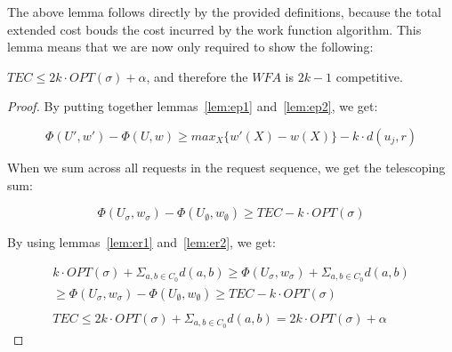 The above lemma follows directly by the provided definitions, because the total extended cost bouds the cost incurred by the work function algorithm. This lemma means that we are now only required to show the following:

\begin{lemma}
    $TEC \leq 2k \cdot  OPT(\sigma) + \alpha$, and therefore the $WFA$ is $2k-1$ competitive.
\end{lemma}

\begin{proof}
    By putting together lemmas~\ref{lem:ep1} and~\ref{lem:ep2}, we get:

    \begin{equation*}
        \Phi(U', w') - \Phi(U, w) \geq max_X\{ w'(X) - w(X)\} -k \cdot  d(u_j, r)
    \end{equation*}

    When we sum across all requests in the request sequence, we get the telescoping sum:

    \begin{equation*}
        \Phi(U_\sigma, w_\sigma) - \Phi(U_\emptyset, w_\emptyset) \geq TEC - k\cdot OPT(\sigma)
    \end{equation*}

    By using lemmas~\ref{lem:er1} and~\ref{lem:er2}, we get:

    \begin{equation*}
        \begin{gathered}
            k \cdot  OPT(\sigma)+ \Sigma_{a, b \in C_0} d(a, b) \geq \Phi(U_\sigma, w_\sigma) + \Sigma_{a, b \in C_0} d(a, b) \\
            \geq \Phi(U_\sigma, w_\sigma) - \Phi(U_\emptyset, w_\emptyset) \geq TEC - k\cdot OPT(\sigma)\\ \\
            TEC \leq 2k \cdot  OPT(\sigma) + \Sigma_{a, b \in C_0} d(a, b) = 2k \cdot OPT(\sigma) + \alpha
        \end{gathered}
    \end{equation*}
\end{proof}
